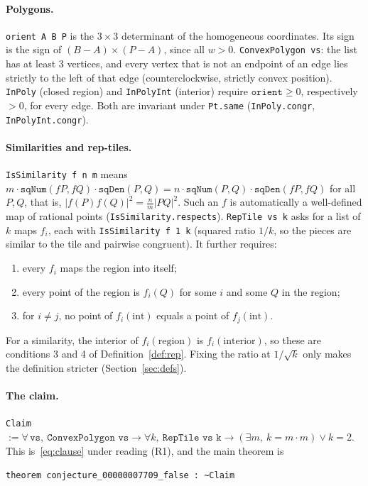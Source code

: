 \documentclass[11pt]{article}
\theoremstyle{definition}
\theoremstyle{remark}
\begin{document}
\paragraph{Polygons.} \texttt{orient A B P} is the $3\times3$ determinant of the
homogeneous coordinates. Its sign is the sign of $(B-A)\times(P-A)$, since all $w>0$.
\texttt{ConvexPolygon vs}: the list has at least $3$ vertices, and every vertex that is not
an endpoint of an edge lies strictly to the left of that edge (counterclockwise, strictly
convex position). \texttt{InPoly} (closed region) and \texttt{InPolyInt} (interior) require
$\texttt{orient}\ge0$, respectively $>0$, for every edge. Both are invariant under
\texttt{Pt.same} (\texttt{InPoly.congr}, \texttt{InPolyInt.congr}).

\paragraph{Similarities and rep-tiles.} \texttt{IsSimilarity f n m} means
$m\cdot\texttt{sqNum}(fP,fQ)\cdot\texttt{sqDen}(P,Q)=n\cdot\texttt{sqNum}(P,Q)\cdot\texttt{sqDen}(fP,fQ)$
for all $P,Q$, that is, $|f(P)f(Q)|^2=\frac nm|PQ|^2$. Such an $f$ is automatically a
well-defined map of rational points (\texttt{IsSimilarity.respects}).
\texttt{RepTile vs k} asks for a list of $k$ maps $f_i$, each with
\texttt{IsSimilarity f 1 k} (squared ratio $1/k$, so the pieces are similar to the tile and
pairwise congruent). It further requires:
\begin{enumerate}
\item every $f_i$ maps the region into itself;
\item every point of the region is $f_i(Q)$ for some $i$ and some $Q$ in the region;
\item for $i\ne j$, no point of $f_i(\mathrm{int})$ equals a point of $f_j(\mathrm{int})$.
\end{enumerate}
For a similarity, the interior of $f_i(\text{region})$ is $f_i(\text{interior})$, so these
are conditions 3 and 4 of Definition~\ref{def:rep}. Fixing the ratio at $1/\sqrt k$ only
makes the definition stricter (Section~\ref{sec:defs}).

\paragraph{The claim.}
\texttt{Claim} $:=\forall\,\texttt{vs},\ \texttt{ConvexPolygon vs}\to\forall k,\ \texttt{RepTile vs k}\to(\exists m,\ k=m\cdot m)\lor k=2$.
This is~\eqref{eq:clause} under reading (R1), and the main theorem is
\begin{center}
\texttt{theorem conjecture\_00000007709\_false : \textasciitilde Claim}
\end{center}
\end{document}
